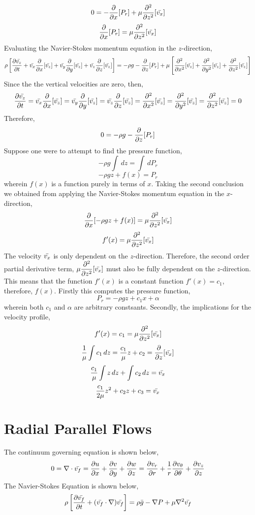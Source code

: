 \documentclass[class=report, 12pt, crop=false]{standalone}
\begin{document}
\begin{center}
$$0 = - \frac{\partial}{\partial x}[P_r] + \mu\frac{\partial^2}{\partial z^2}[\bar{v_x}]$$
$$\frac{\partial}{\partial x}[P_r] =  \mu\frac{\partial^2}{\partial z^2}[\bar{v_x}]$$
Evaluating the Navier-Stokes momentum equation in the $z$-direction,
$$\rho\left[\frac{\partial\bar{v_z}}{\partial t} + \bar{v_x}\frac{\partial}{\partial x}[\bar{v_z}] + \bar{v_y}\frac{\partial}{\partial y}[\bar{v_z}] + \bar{v_z}\frac{\partial}{\partial z}[\bar{v_z}]\right] = -\rho g - \frac{\partial}{\partial z}[P_r] + \mu\left[\frac{\partial^2}{\partial x^2}[\bar{v_z}] + \frac{\partial^2}{\partial y^2}[\bar{v_z}] + \frac{\partial^2}{\partial z^2}[\bar{v_z}]\right]$$
Since the the vertical velocities are zero, then,
$$\frac{\partial\bar{v_z}}{\partial t} = \bar{v_x}\frac{\partial}{\partial x}[\bar{v_z}] = \bar{v_y}\frac{\partial}{\partial y}[\bar{v_z}] = \bar{v_z}\frac{\partial}{\partial z}[\bar{v_z}] = \frac{\partial^2}{\partial x^2}[\bar{v_z}] = \frac{\partial^2}{\partial y^2}[\bar{v_z}] = \frac{\partial^2}{\partial z^2}[\bar{v_z}] = 0$$
Therefore,
$$0 = -\rho g - \frac{\partial}{\partial z}[P_r]$$
Suppose one were to attempt to find the pressure function,
$$-\rho g \int\,dz = \int \,dP_r$$
$$-\rho g z + f(x) = P_r$$
wherein $f(x)$ is a function purely in terms of $x$. Taking the second conclusion we obtained from applying the Navier-Stokes momentum equation in the $x$-direction,
$$\frac{\partial}{\partial x}[-\rho g z + f(x)] =  \mu\frac{\partial^2}{\partial z^2}[\bar{v_x}]$$
$$f'(x) =  \mu\frac{\partial^2}{\partial z^2}[\bar{v_x}]$$
The velocity $\bar{v_x}$ is only dependent on the $z$-direction. Therefore, the second order partial derivative term, $\displaystyle{\mu\frac{\partial^2}{\partial z^2}[\bar{v_x}]}$ must also be fully dependent on the $z$-direction. This means that the function $f'(x)$ is a constant function $f'(x) = c_1$, therefore, $f(x)$. Firstly this computes the pressure function,
$$P_r = -\rho g z + c_1 x + \alpha$$ 
wherein both $c_1$ and $\alpha$ are arbitrary constsants. Secondly, the implications for the velocity profile,
$$f'(x) = c_1 = \mu\frac{\partial^2}{\partial z^2}[\bar{v_x}]$$
$$\frac{1}{\mu}\int c_1\,dz = \frac{c_1}{\mu}z + c_2 = \frac{\partial}{\partial z}[\bar{v_x}]$$
$$\frac{c_1}{\mu}\int z\,dz + \int c_2\,dz = \bar{v_x}$$
$$\frac{c_1}{2\mu} z^2 + c_2z +c_3 = \bar{v_x}$$
\section{Radial Parallel Flows}
\begin{comment}
\end{comment}
The continuum governing equation is shown below,
$$0 = \nabla\cdot\bar{v_f} = \frac{\partial u}{\partial x} + \frac{\partial v}{\partial y} + \frac{\partial w}{\partial z} = \frac{\partial v_r}{\partial r} + \frac{1}{r}\frac{\partial v_\theta}{\partial\theta} + \frac{\partial v_z}{\partial z}$$
The Navier-Stokes Equation is shown below,
$$\rho\left[\frac{\partial\bar{v_f}}{\partial t} + (\bar{v_f}\cdot\nabla)\bar{v_f}\right] = \rho \bar{g} - \nabla P + \mu\nabla^2\bar{v_f}$$

\end{center}
\end{document}
